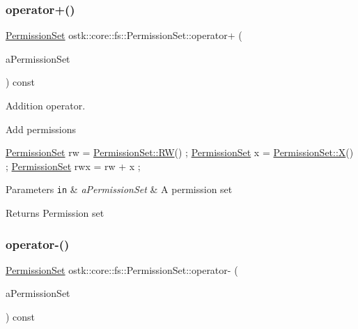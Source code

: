 \subsubsection{\texorpdfstring{operator+()}{operator+()}}
{\footnotesize\ttfamily \hyperlink{classostk_1_1core_1_1fs_1_1_permission_set}{Permission\+Set} ostk\+::core\+::fs\+::\+Permission\+Set\+::operator+ (\begin{DoxyParamCaption}\item[{const \hyperlink{classostk_1_1core_1_1fs_1_1_permission_set}{Permission\+Set} \&}]{a\+Permission\+Set }\end{DoxyParamCaption}) const}



Addition operator. 

Add permissions


\begin{DoxyCode}
\hyperlink{classostk_1_1core_1_1fs_1_1_permission_set_a31c918014e874ceac487e92d0d3ac5a2}{PermissionSet} rw = \hyperlink{classostk_1_1core_1_1fs_1_1_permission_set_ad58bc0911ca89d3c03c089f1647d0315}{PermissionSet::RW}() ;
\hyperlink{classostk_1_1core_1_1fs_1_1_permission_set_a31c918014e874ceac487e92d0d3ac5a2}{PermissionSet} x = \hyperlink{classostk_1_1core_1_1fs_1_1_permission_set_ac84670d9520228b38bb8555b7f1e399f}{PermissionSet::X}() ;
\hyperlink{classostk_1_1core_1_1fs_1_1_permission_set_a31c918014e874ceac487e92d0d3ac5a2}{PermissionSet} rwx = rw + x ;
\end{DoxyCode}



\begin{DoxyParams}[1]{Parameters}
\mbox{\tt in}  & {\em a\+Permission\+Set} & A permission set \\
\hline
\end{DoxyParams}
\begin{DoxyReturn}{Returns}
Permission set 
\end{DoxyReturn}
\mbox{\label{classostk_1_1core_1_1fs_1_1_permission_set_a8a4b2a481044ebb42be476f5410c5c93}} 
\subsubsection{\texorpdfstring{operator-\/()}{operator-()}}
{\footnotesize\ttfamily \hyperlink{classostk_1_1core_1_1fs_1_1_permission_set}{Permission\+Set} ostk\+::core\+::fs\+::\+Permission\+Set\+::operator-\/ (\begin{DoxyParamCaption}\item[{const \hyperlink{classostk_1_1core_1_1fs_1_1_permission_set}{Permission\+Set} \&}]{a\+Permission\+Set }\end{DoxyParamCaption}) const}



